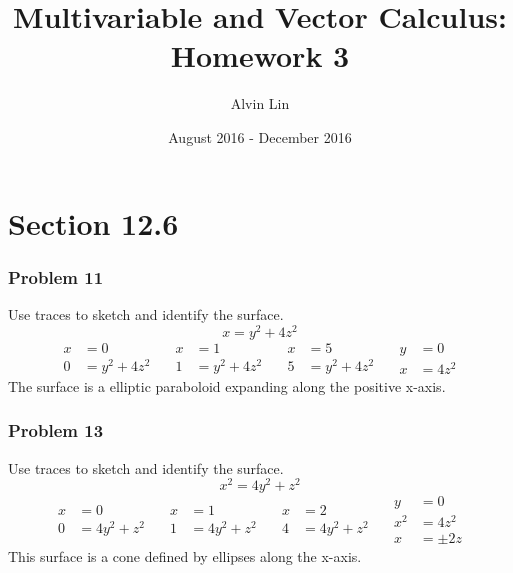 \documentclass[letterpaper, 12pt]{math}
\title{Multivariable and Vector Calculus: Homework 3}
\author{Alvin Lin}
\date{August 2016 - December 2016}
\begin{document}
\maketitle

\section*{Section 12.6}

\subsubsection*{Problem 11}
Use traces to sketch and identify the surface.
\[ x = y^2+4z^2 \]
\[\begin{split}
  x &= 0 \\
  0 &= y^2+4z^2
\end{split}\quad
\begin{split}
  x &= 1 \\
  1 &= y^2+4z^2
\end{split}\quad
\begin{split}
  x &= 5 \\
  5 &= y^2+4z^2
\end{split}\quad
\begin{split}
  y &= 0 \\
  x &= 4z^2
\end{split} \]
The surface is a elliptic paraboloid expanding along the positive x-axis.

\subsubsection*{Problem 13}
Use traces to sketch and identify the surface.
\[ x^2 = 4y^2+z^2 \]
\[\begin{split}
  x &= 0 \\
  0 &= 4y^2+z^2
\end{split}\quad
\begin{split}
  x &= 1 \\
  1 &= 4y^2+z^2
\end{split}\quad
\begin{split}
  x &= 2 \\
  4 &= 4y^2+z^2
\end{split}\quad
\begin{split}
  y &= 0 \\
  x^2 &= 4z^2 \\
  x &= \pm2z
\end{split} \]
This surface is a cone defined by ellipses along the x-axis.
\end{document}

